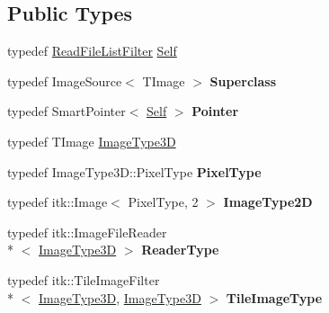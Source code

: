 \subsection*{Public Types}
\begin{DoxyCompactItemize}
\item 
typedef \hyperlink{classitk_1_1_read_file_list_filter}{Read\-File\-List\-Filter} \hyperlink{classitk_1_1_read_file_list_filter_a673994032806285b12a3de9b7d536fbd}{Self}
\item 
\hypertarget{classitk_1_1_read_file_list_filter_ab2a471ee65795c4fc766ff95d5c46c28}{typedef Image\-Source$<$ T\-Image $>$ {\bfseries Superclass}}\label{classitk_1_1_read_file_list_filter_ab2a471ee65795c4fc766ff95d5c46c28}

\item 
\hypertarget{classitk_1_1_read_file_list_filter_a1dcc0b9499c8c2a2d1a9774bf90fabdf}{typedef Smart\-Pointer$<$ \hyperlink{classitk_1_1_read_file_list_filter_a673994032806285b12a3de9b7d536fbd}{Self} $>$ {\bfseries Pointer}}\label{classitk_1_1_read_file_list_filter_a1dcc0b9499c8c2a2d1a9774bf90fabdf}

\item 
typedef T\-Image \hyperlink{classitk_1_1_read_file_list_filter_a3304e18c3540c65622d7989c8bf0f6d1}{Image\-Type3\-D}
\item 
\hypertarget{classitk_1_1_read_file_list_filter_aa781d047f9185530c3bf154eed6f7819}{typedef Image\-Type3\-D\-::\-Pixel\-Type {\bfseries Pixel\-Type}}\label{classitk_1_1_read_file_list_filter_aa781d047f9185530c3bf154eed6f7819}

\item 
\hypertarget{classitk_1_1_read_file_list_filter_af650153cfcfdbdf549bf5872a858d3c1}{typedef itk\-::\-Image$<$ Pixel\-Type, 2 $>$ {\bfseries Image\-Type2\-D}}\label{classitk_1_1_read_file_list_filter_af650153cfcfdbdf549bf5872a858d3c1}

\item 
\hypertarget{classitk_1_1_read_file_list_filter_abbf235cab658cc8b649e34316dd180a1}{typedef itk\-::\-Image\-File\-Reader\\*
$<$ \hyperlink{classitk_1_1_read_file_list_filter_a3304e18c3540c65622d7989c8bf0f6d1}{Image\-Type3\-D} $>$ {\bfseries Reader\-Type}}\label{classitk_1_1_read_file_list_filter_abbf235cab658cc8b649e34316dd180a1}

\item 
\hypertarget{classitk_1_1_read_file_list_filter_a7b608b7c088ecda95e6d37e2ef4dfc17}{typedef itk\-::\-Tile\-Image\-Filter\\*
$<$ \hyperlink{classitk_1_1_read_file_list_filter_a3304e18c3540c65622d7989c8bf0f6d1}{Image\-Type3\-D}, \hyperlink{classitk_1_1_read_file_list_filter_a3304e18c3540c65622d7989c8bf0f6d1}{Image\-Type3\-D} $>$ {\bfseries Tile\-Image\-Type}}\label{classitk_1_1_read_file_list_filter_a7b608b7c088ecda95e6d37e2ef4dfc17}


\end{DoxyCompactItemize}
